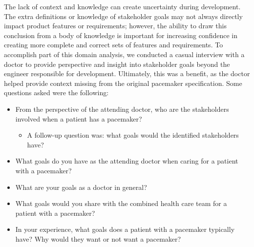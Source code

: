 The lack of context and knowledge can create uncertainty during development. The extra definitions or knowledge of stakeholder goals may not always directly impact product features or requirements; however, the ability to draw this conclusion from a body of knowledge is important for increasing confidence in creating more complete and correct sets of features and requirements. To accomplish part of this domain analysis, we conducted a casual interview with a doctor to provide perspective and insight into stakeholder goals beyond the engineer responsible for development. Ultimately, this was a benefit, as the doctor helped provide context missing from the original pacemaker specification. Some questions asked were the following:
\begin{itemize}
	\item From the perspective of the attending doctor, who are the stakeholders involved when a patient has a pacemaker?
	\begin{itemize}
		\item A follow-up question was: what goals would the identified stakeholders have?
	\end{itemize}
	\item What goals do you have as the attending doctor when caring for a patient with a pacemaker?
	\item What are your goals as a doctor in general?
	\item What goals would you share with the combined health care team for a patient with a pacemaker?
	\item In your experience, what goals does a patient with a pacemaker typically have? Why would they want or not want a pacemaker?
\end{itemize}




